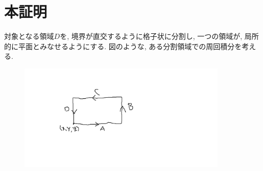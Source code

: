 \documentclass{jsarticle}
\begin{document}
\section{本証明}
対象となる領域$D$を, 境界が直交するように格子状に分割し, 一つの領域が, 局所的に平面とみなせるようにする. 
図のような, ある分割領域での周回積分を考える. 
\begin{figure}[htbp]
  \begin{center}
    \includegraphics[width=10cm]{Figure/SmallArea.png}
  \end{center}
\end{figure}
\end{document}
